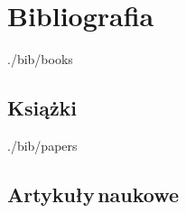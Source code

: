 
\clearpage
\chapter*{Bibliografia}



\begin{btSect}[plain]{./bib/books}
 \section*{Książki}
 \btPrintCited
\end{btSect}

\begin{btSect}[plain]{./bib/papers}
 \section*{Artykuły\,naukowe}
 \btPrintCited
\end{btSect}


